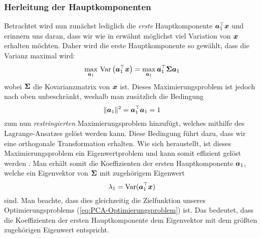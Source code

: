 \subsubsection{Herleitung der Hauptkomponenten}
\label{ch:MethodenDerDimRed:statistisch:PCA:HerleitungPC}
Betrachtet wird nun zunächst lediglich die \textit{erste} Hauptkomponente $\bm{a}_1^\top \bm{x}$ und erinnern uns daran, dass wir wie in  erwähnt möglichst viel Variation von $\bm{x}$ erhalten möchten. Daher wird die erste Hauptkomponente so gewählt, dass die Varianz maximal wird:
\begin{equation}
	\label{eq:PCA-Optimierungsproblem}
	\max_{\bm{a}_1}\, \operatorname{Var} \left( \bm{a}_1^\top \bm{x} \right) = \max_{\bm{a}_1} \bm{a}_1^\top \mathbf{\Sigma} \bm{a}_1
\end{equation}
wobei $\mathbf{\Sigma}$ die Kovarianzmatrix von $\bm{x}$ ist. Dieses Maximierungsproblem ist jedoch nach oben unbeschränkt, weshalb man zusätzlich die Bedingung
\begin{equation}
	\lVert \bm{a}_1 \rVert^2 = \bm{a}_1^\top \bm{a}_1 = 1
\end{equation}
zum nun \textit{restringierten} Maximierungsproblem hinzufügt, welches mithilfe des Lagrange-Ansatzes gelöst werden kann. Diese Bedingung führt dazu, dass wir eine orthogonale Transformation erhalten. Wie sich heraustellt, ist dieses Maximierungsproblem ein Eigenwertproblem und kann somit effizient gelöst werden \parencite[vgl.][4 -- 6]{Jolliffe.2002}. Man erhält somit die Koeffizienten
der ersten Hauptkomponente $\bm{a}_1$, welche ein Eigenvektor von $\mathbf{\Sigma}$ mit zugehörigem
Eigenwert
\begin{equation}
	\lambda_1 = \operatorname{Var}(\bm{a}_1^\top \bm{x})
\end{equation}
sind. Man beachte, dass dies gleichzeitig die Zielfunktion unseres Optimierungsproblems (\eqref{eq:PCA-Optimierungsproblem}) ist. Das bedeutet, dass die Koeffizienten der ersten Hauptkomponente dem Eigenvektor mit dem größten zugehörigen Eigenwert entspricht.

